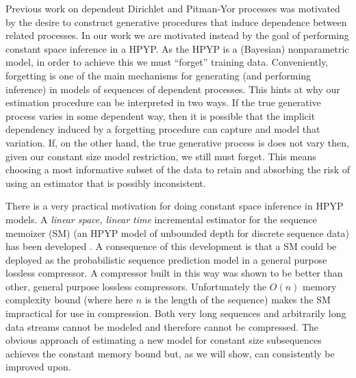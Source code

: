 Previous work on dependent Dirichlet and Pitman-Yor processes \cite{MacEachern2000, Srebro2005, Griffin2006, Caron2007, Caron2007a} was motivated by the desire to construct generative procedures that induce dependence between related processes.  In our work we are motivated instead by the goal of performing constant space inference in a HPYP.  As the HPYP is a (Bayesian) nonparametric model, in order to achieve this we must ``forget'' training data.  Conveniently, forgetting is one of the main mechanisms for generating (and performing inference) in models of sequences of dependent processes.  This hints at why our estimation procedure can be interpreted in two ways.  If the true generative process varies in some dependent way, then it is possible that the implicit dependency induced by a forgetting procedure can capture and model that variation.  If, on the other hand, the true generative process is does not vary then, given our constant size model restriction, we still must forget.  This means choosing a  most informative subset of the data to retain and absorbing the risk of using an estimator that is possibly inconsistent.

 
There is a very practical motivation for doing constant space inference in HPYP models.  A  {\em linear space, linear time} incremental estimator for the sequence memoizer (SM) \cite{Wood2009} (an HPYP model of unbounded depth for discrete sequence data) has been developed \cite{Gasthaus2010}.   A consequence of this development is that a SM could be deployed as the probabilistic sequence prediction model in a general purpose lossless compressor.   A compressor built in this way was shown to be better than other, general purpose lossless compressors.  Unfortunately the $O(n)$ memory complexity bound (where here $n$ is the length of the sequence) makes the SM impractical for use in compression.  Both very long sequences and arbitrarily long data streams cannot be modeled and therefore cannot be compressed.  The obvious approach of estimating a new model for constant size subsequences achieves the constant memory bound but, as we will show, can consistently be improved upon.  



